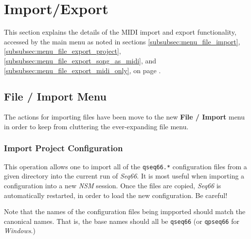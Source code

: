 %
%
%

\section{Import/Export}
\label{sec:midi_export}

   This section explains the details of the MIDI import and export
   functionality, accessed by the main menu as noted in sections
   \ref{subsubsec:menu_file_import},
   \ref{subsubsec:menu_file_export_project},
   \ref{subsubsec:menu_file_export_song_as_midi}, and
   \ref{subsubsec:menu_file_export_midi_only}, on page
   \pageref{subsubsec:menu_file_import}.

\subsection{File / Import Menu}
\label{subsec:midi_export_file_import_menu}

   The actions for importing files have been move to the new
   \textbf{File / Import} menu in order to keep from cluttering the
   ever-expanding file menu.

\subsubsection{Import Project Configuration}
\label{subsubsec:midi_export_file_import_project}

   This operation allows one to import all of the \texttt{qseq66.*}
   configuration files from a given directory into the current run of
   \textsl{Seq66}.
   It is most useful when
   importing a configuration into a new \textsl{NSM} session.
   Once the files are copied, \textsl{Seq66} is automatically restarted,
   in order to load the new configuration.  Be careful!

   Note that the names of the configuration files being impported should
   match the canonical names.  That is, the base names should all be
   \texttt{qseq66} (or \texttt{qpseq66} for \textsl{Windows}.)

